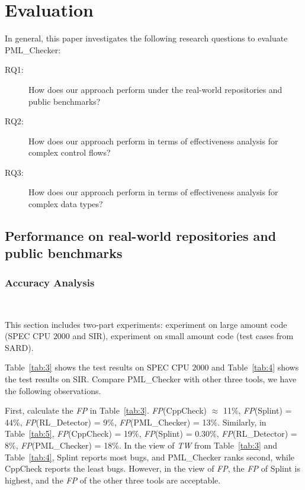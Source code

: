 \section{Evaluation}\label{sec:evaluation}

In general, this paper investigates the following research questions to evaluate PML\_Checker:
\begin{description}
\item[RQ1:] How does our approach perform under the real-world repositories and public benchmarks? 
\item[RQ2:] How does our approach perform in terms of effectiveness analysis for complex control flows? 
\item[RQ3:] How does our approach perform in terms of effectiveness analysis for complex data types? 
\end{description}

\subsection{Performance on real-world repositories and public benchmarks}


\subsubsection{Accuracy Analysis}

\ 

This section includes two-part experiments: experiment on large amount code (SPEC CPU $2000$ and SIR), experiment on small amount code (test cases from SARD).

Table~\ref{tab:3} shows the test results on SPEC CPU $2000$ and Table~\ref{tab:4} shows the test results on SIR. Compare PML\_Checker with other three tools, we have the following observations. 

First, calculate the \textit{FP} in Table~\ref{tab:3}. \textit{FP}(CppCheck) $\approx$ 11\%, \textit{FP}(Splint) = 44\%, \textit{FP}(RL\_Detector) = 9\%, \textit{FP}(PML\_Checker) = 13\%. Similarly, in Table~\ref{tab:5}, \textit{FP}(CppCheck) = 19\%, \textit{FP}(Splint) = 0.30\%, \textit{FP}(RL\_Detector) = 8\%, \textit{FP}(PML\_Checker) = 18\%.
In the view of \textit{TW} from Table~\ref{tab:3} and Table~\ref{tab:4}, Splint reports most bugs, and PML\_Checker ranks second, while CppCheck reports the least bugs. However, in the view of \textit{FP}, the \textit{FP} of Splint is highest, and the \textit{FP} of the other three tools are acceptable.


